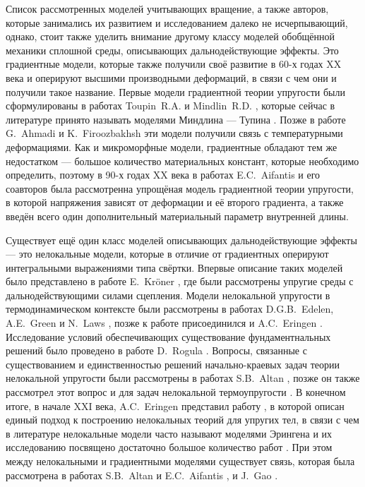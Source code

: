 Список рассмотренных моделей учитывающих вращение, а также авторов, которые занимались их развитием и исследованием далеко не исчерпывающий, однако, стоит также уделить внимание другому классу моделей обобщённой механики сплошной среды, описывающих дальнодействующие эффекты. Это градиентные модели, которые также получили своё развитие в 60-х годах XX века и оперируют высшими производными деформаций, в связи с чем они и получили такое название. Первые модели градиентной теории упругости были сформулированы в работах Toupin~R.A. \cite{Toupin} и Mindlin~R.D. \cite{Mindlin4, Mindlin5}, которые сейчас в литературе принято называть моделями Миндлина --- Тупина \cite{ToupinMindlin1, ToupinMindlin2, ToupinMindlin3}. Позже в работе G.~Ahmadi и K.~Firoozbakhsh \cite{GradientThermoelasticity} эти модели получили связь с температурными деформациями. Как и микроморфные модели, градиентные обладают тем же недостатком --- большое количество материальных констант, которые необходимо определить, поэтому в 90-х годах XX века в работах E.C.~Aifantis и его соавторов \cite{Aifantis1, Aifantis2} была рассмотренна упрощёная модель градиентной теории упругости, в которой напряжения зависят от деформации и её второго градиента, а также введён всего один дополнительный материальный параметр внутренней длины.

Существует ещё один класс моделей описывающих дальнодействующие эффекты --- это нелокальные модели, которые в отличие от градиентных оперируют интегральными выражениями типа свёртки. Впервые описание таких моделей было представлено в работе E.~Kr{\"o}ner \cite{Kroner}, где были рассмотрены упругие среды с дальнодействующими силами сцепления. Модели нелокальной упругости в термодинамическом контексте были рассмотрены в работах D.G.B.~Edelen, A.E.~Green и N.~Laws \cite{Edelen1, Edelen2}, позже к работе присоединился и A.C.~Eringen \cite{Eringen5, Eringen6}. Исследование условий обеспечивающих существование фундаментнальных решений было проведено в работе D.~Rogula \cite{Rogula1982}. Вопросы, связанные с существованием и единственностью решений начально-краевых задач теории нелокальной упругости были рассмотрены в работах S.B.~Altan \cite{Altan1, Altan2}, позже он также рассмотрел этот вопрос и для задач нелокальной термоупругости \cite{Altan3, Altan4}. В конечном итоге, в начале XXI века, A.C.~Eringen представил работу \cite{Eringen1}, в которой описан единый подход к построению нелокальных теорий для упругих тел, в связи с чем в литературе нелокальные модели часто называют моделями Эрингена и их исследованию посвящено достаточно большое количество работ \cite{BondaryLayer, Tuna, Rahmani}. При этом между нелокальными и градиентными моделями существует связь, которая была рассмотрена в работах S.B.~Altan и E.C.~Aifantis \cite{Aifantis3}, и J.~Gao \cite{Gao}.

